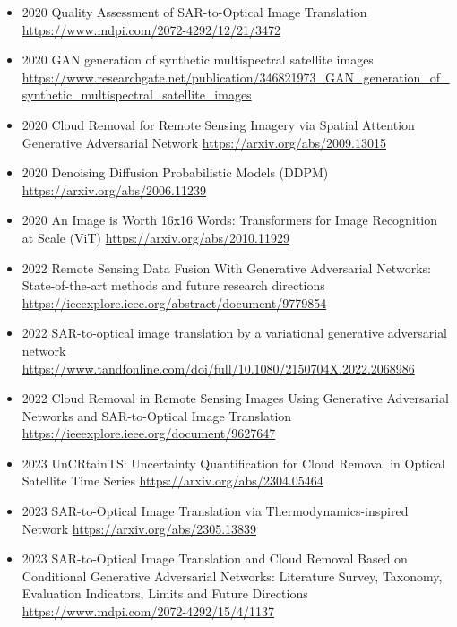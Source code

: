 \begin{itemize}
    \item 2020 Quality Assessment of SAR-to-Optical Image Translation
    \url{https://www.mdpi.com/2072-4292/12/21/3472}

    \item 2020 GAN generation of synthetic multispectral satellite images
    \url{https://www.researchgate.net/publication/346821973_GAN_generation_of_synthetic_multispectral_satellite_images}
    
    \item 2020 Cloud Removal for Remote Sensing Imagery via Spatial Attention Generative Adversarial Network
    \url{https://arxiv.org/abs/2009.13015}

    \item 2020 Denoising Diffusion Probabilistic Models (DDPM)
    \url{https://arxiv.org/abs/2006.11239}

    \item 2020 An Image is Worth 16x16 Words: Transformers for Image Recognition at Scale (ViT)
    \url{https://arxiv.org/abs/2010.11929}

    \item 2022 Remote Sensing Data Fusion With Generative Adversarial Networks: State-of-the-art methods and future research directions
    \url{https://ieeexplore.ieee.org/abstract/document/9779854}

    \item 2022 SAR-to-optical image translation by a variational generative adversarial network
    \url{https://www.tandfonline.com/doi/full/10.1080/2150704X.2022.2068986}

    \item 2022 Cloud Removal in Remote Sensing Images Using Generative Adversarial Networks and SAR-to-Optical Image Translation
    \url{https://ieeexplore.ieee.org/document/9627647}

    \item 2023 UnCRtainTS: Uncertainty Quantification for Cloud Removal in Optical Satellite Time Series
    \url{https://arxiv.org/abs/2304.05464}

    \item 2023 SAR-to-Optical Image Translation via Thermodynamics-inspired Network
    \url{https://arxiv.org/abs/2305.13839}
    
    \item 2023 SAR-to-Optical Image Translation and Cloud Removal Based on Conditional Generative Adversarial Networks: Literature Survey, Taxonomy, Evaluation Indicators, Limits and Future Directions
    \url{https://www.mdpi.com/2072-4292/15/4/1137}


\end{itemize}
